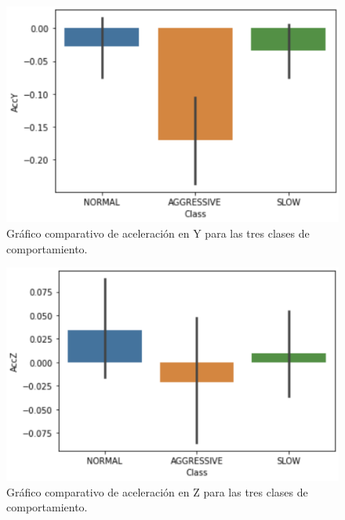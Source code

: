 \documentclass[spanish,12pt,letterpaper]{article}
\begin{document}
    \begin{figure}[H]
        \centering
        \includegraphics[width=1\columnwidth]{AccY.png}
        \caption{Gráfico comparativo de aceleración en Y para las tres clases de comportamiento.}
        \label{fig:comand}%
    \end{figure}

    \begin{figure}[H]
        \centering
        \includegraphics[width=1\columnwidth]{AccZ.png}
        \caption{Gráfico comparativo de aceleración en Z para las tres clases de comportamiento.}
        \label{fig:comand}%
    \end{figure}
\end{document}
